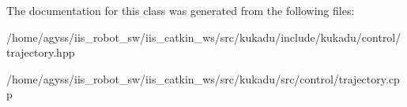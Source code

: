 The documentation for this class was generated from the following files\+:\begin{DoxyCompactItemize}
\item 
/home/agyss/iis\+\_\+robot\+\_\+sw/iis\+\_\+catkin\+\_\+ws/src/kukadu/include/kukadu/control/trajectory.\+hpp\item 
/home/agyss/iis\+\_\+robot\+\_\+sw/iis\+\_\+catkin\+\_\+ws/src/kukadu/src/control/trajectory.\+cpp\end{DoxyCompactItemize}
